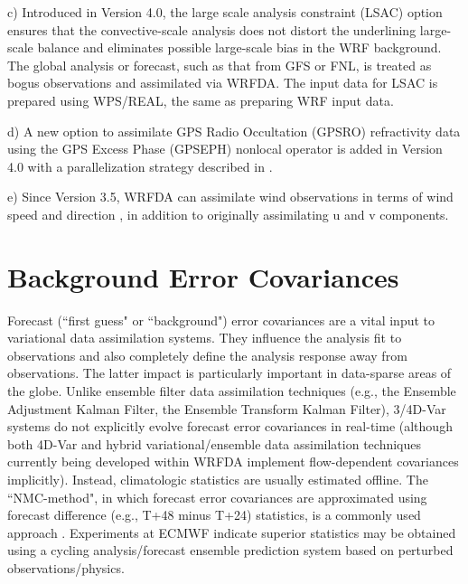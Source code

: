 \vspace{0.5cm}

c) Introduced in Version 4.0, the large scale analysis constraint (LSAC) option \citep{ven16} ensures that the convective-scale 
analysis does not distort the underlining large-scale balance and eliminates possible large-scale bias in the WRF background. The global analysis or forecast, such as that from GFS or FNL, is treated as bogus observations and assimilated via WRFDA. The input data for LSAC is prepared using WPS/REAL, the same as preparing WRF input data.

\vspace{0.5cm}

d) A new option to assimilate GPS Radio Occultation (GPSRO) refractivity data using the GPS Excess Phase (GPSEPH)
nonlocal operator \citep{chen09} is added in Version 4.0 with a parallelization strategy described in \citep{zhang14b}.

\vspace{0.5cm}

e) Since Version 3.5, WRFDA can assimilate wind observations in terms of wind speed and direction \citep{huang13,gao15}, 
in addition to originally assimilating u and v components.

\section{Background Error Covariances}
\label{var-be}

Forecast (``first guess" or ``background") error covariances are a vital input to variational 
data assimilation systems. They influence the analysis fit to observations and also 
completely define the analysis response away from observations. The latter impact is 
particularly important in data-sparse areas of the globe. Unlike ensemble filter data 
assimilation techniques (e.g., the Ensemble Adjustment Kalman Filter, the Ensemble 
Transform Kalman Filter), 3/4D-Var systems do not explicitly evolve forecast error 
covariances in real-time (although both 4D-Var and hybrid variational/ensemble data assimilation techniques currently being developed within WRFDA implement flow-dependent covariances implicitly). Instead, climatologic statistics are usually estimated offline. 
The ``NMC-method", in which forecast error covariances are approximated using 
forecast difference (e.g., T+48 minus T+24) statistics, is a commonly used approach 
\citep{parrish92}. Experiments at ECMWF \citep{fisher03} indicate superior statistics may 
be obtained using a cycling analysis/forecast ensemble prediction
system based on perturbed observations/physics.

